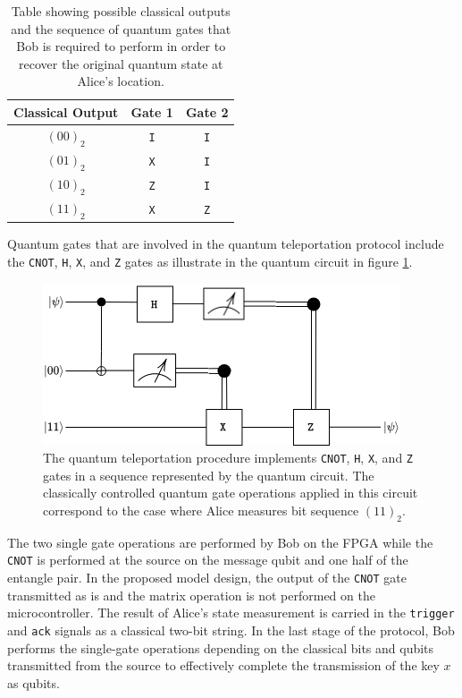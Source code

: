 \begin{table}[ht!]
	\centering
	\caption[Table Showing Possible Classical Outputs and Required Quantum Gates for the Quantum Teleportation Circuit.]{Table showing possible classical outputs and the sequence of quantum gates that Bob is required to perform in order to recover the original quantum state at Alice's location.}
	\label{tab:teleportation-table}
	\begin{tabular}{ |c|c|c| } 
		\hline
		\textbf{Classical Output} & \textbf{Gate 1} & \textbf{Gate 2}\\ 
		\hline
		$(00)_2$ & \texttt{I} & \texttt{I} \\ 
		\hline
		$(01)_2$ & \texttt{X} & \texttt{I} \\ 
		\hline
		$(10)_2$ & \texttt{Z} & \texttt{I} \\ 
		\hline
		$(11)_2$ & \texttt{X} & \texttt{Z} \\ 
		\hline
	\end{tabular}
\end{table}

Quantum gates that are involved in the quantum teleportation protocol include the \texttt{CNOT}, \texttt{H}, \texttt{X}, and \texttt{Z} gates as illustrate in the quantum circuit in figure \ref{fig:quantum-teleportation-circuit}. 
\begin{figure}[!ht]
	\centering
	\includegraphics[width=\linewidth]{body/ch4/figs/quantum-teleportation-circuit}
	\caption[Quantum Circuit of the Quantum Teleportation Protocol.]{The quantum teleportation procedure implements \texttt{CNOT}, \texttt{H}, \texttt{X}, and \texttt{Z} gates in a sequence represented by the quantum circuit. The classically controlled quantum gate operations applied in this circuit correspond to the case where Alice measures bit sequence $(11)_2$.}
	\label{fig:quantum-teleportation-circuit}
\end{figure}

The two single gate operations are performed by Bob on the FPGA while the \texttt{CNOT} is performed at the source on the message qubit and one half of the entangle pair. In the proposed model design, the output of the \texttt{CNOT} gate transmitted as is and the matrix operation is not performed on the microcontroller. The result of Alice's state measurement is carried in the \texttt{trigger} and \texttt{ack} signals as a classical two-bit string. In the last stage of the protocol, Bob performs the single-gate operations depending on the classical bits and qubits transmitted from the source to effectively complete the transmission of the key $x$ as qubits. 

